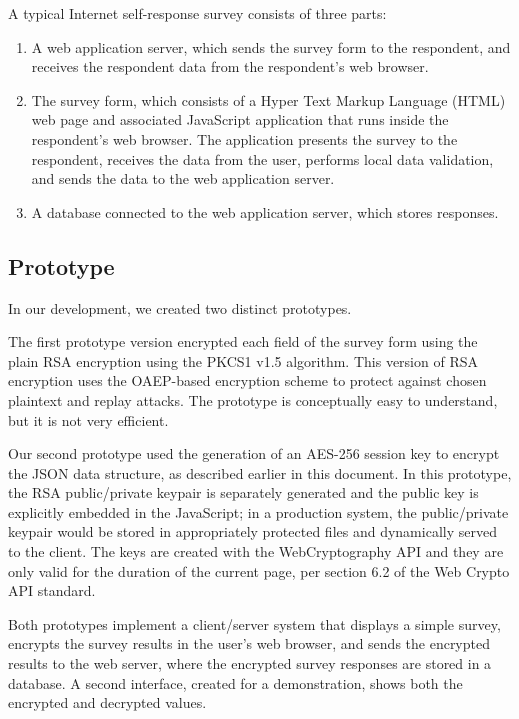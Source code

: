 \documentclass[fleqn,10pt]{wlscirep}
\begin{document}
A typical Internet self-response survey consists of three parts:

\begin{enumerate}
  \item A web application server, which sends the survey form to
    the respondent, and receives the respondent data from the
    respondent's web browser.
  \item The survey form, which consists of a Hyper Text Markup
    Language (HTML) web page and associated JavaScript application
    that runs inside the respondent's web browser. The application
    presents the survey to the respondent, receives the data from the user, performs
    local data validation, and sends the data to the web application
    server.
  \item A database connected to the web application server, which stores responses.
\end{enumerate}

\subsection{Prototype}
In our development, we created two distinct prototypes.

The first prototype version encrypted each field of the survey form
using the plain RSA encryption using the PKCS1 v1.5
algorithm. This version of RSA encryption uses the OAEP-based
encryption scheme to protect against chosen plaintext and replay
attacks. The prototype is conceptually easy to understand, but it is not very efficient. 

Our second prototype used the generation of an AES-256 session
key to encrypt the JSON data structure, as described earlier in this
document. In this prototype, the RSA public/private keypair is
separately generated and the public key is explicitly embedded in the JavaScript; in a production
system, the public/private keypair would be stored in appropriately
protected files and dynamically served to the client. The keys are
created with the WebCryptography API and they are only valid for the
duration of the current page, per section 6.2 of the Web Crypto API standard.

Both prototypes implement a client/server system that displays a
simple survey, encrypts the survey results in the user's web browser,
and sends the encrypted results to the web server, where the encrypted
survey responses are stored in a database. A second interface, created
for a demonstration, shows both the encrypted and decrypted values.
\end{document}
